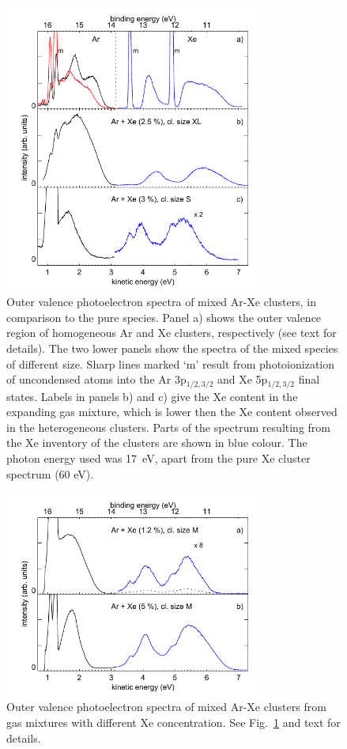 \begin{figure}[ht]
 \centering
 \includegraphics[width=8.5cm]{pics/figure_oval_1.pdf}
 \caption{
Outer valence photoelectron spectra of mixed Ar-Xe clusters, in comparison to the pure species. Panel a) shows the outer valence region of homogeneous Ar and Xe clusters, respectively (see text for details). The two lower panels show the spectra of the mixed species of different size. Sharp lines marked `m' result from photoionization of uncondensed atoms into the Ar 3p$_{1/2,3/2}$ and Xe 5p$_{1/2,3/2}$ final states. Labels in panels b) and c) give the Xe content in the expanding gas mixture, which is lower then the Xe content observed in the heterogeneous clusters. Parts of the spectrum resulting from the Xe inventory of the clusters are shown in blue colour. The photon energy used was 17~eV, apart from the pure Xe cluster spectrum (60 eV).
}
 \label{figure:oval1}
\end{figure}


\begin{figure}[ht]
 \centering
 \includegraphics[width=8.5cm]{pics/figure_oval_2.pdf}
 \caption{
Outer valence photoelectron spectra of mixed Ar-Xe clusters from gas mixtures with different Xe concentration. See Fig.\ \ref{figure:oval1} and text for details.
}
 \label{figure:oval2}
\end{figure}




